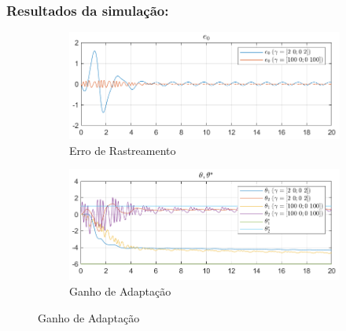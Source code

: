 \documentclass[10pt]{article}
\begin{document}
\subsubsection{Resultados da simulação:}

\begin{figure}[h!]
    \centering
    \begin{subfigure}[b]{0.35\textwidth}
        \centering
        \includegraphics[width=\textwidth]{img/fig06a.png}
        \caption{Erro de Rastreamento}
    \end{subfigure}
    \begin{subfigure}[b]{0.35\textwidth}
        \centering
        \includegraphics[width=\textwidth]{img/fig06b.png}
        \caption{Ganho de Adaptação}
    \end{subfigure}


\end{figure}
\end{document}
